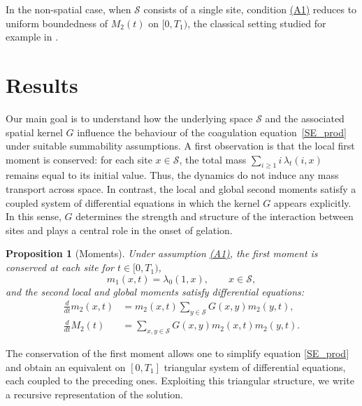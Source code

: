 \documentclass[12pt,twoside]{article}
\newtheorem{prop}[thm]{Proposition}
\begin{document}
In the non-spatial case, when $\mathcal S$ consists of a single site,
condition \hyperlink{ass:A1}{(A1)} reduces to uniform boundedness of $M_2(t)$ on $[0,T_1)$, the
classical setting studied for example in \cite[Theorem~1]{mcleod-62-1}.

\section{Results}\label{sec:results}
Our main goal is to understand how the underlying space $\mathcal S$ and the associated spatial kernel $G$ influence the behaviour of the coagulation equation~\eqref{SE_prod} under suitable summability assumptions.  
A first observation is that the local first moment is conserved: for each site $x\in\mathcal S$, the total mass $\sum_{i\ge1} i\,\lambda_t(i,x)$
remains equal to its initial value. Thus, the dynamics do not induce any mass transport across space.  
In contrast, the local and global second moments satisfy a coupled system of differential equations in which the kernel $G$ appears explicitly. In this sense, $G$ determines the strength and structure of the interaction between sites and plays a central role in the onset of gelation.
\begin{prop}[Moments]\label{prop:moment-equations}
Under assumption \hyperlink{ass:A1}{(A1)},  the first moment is conserved at each site for $t\in[0,T_1)$,
\begin{equation}\label{eq:consm1}
m_1(x,t)=\lambda_0(1,x),
\qquad x\in\mathcal S,
\end{equation}
and the second  local and global moments satisfy differential equations:
\begin{align}
\frac{d}{dt} m_2(x,t)&= m_2(x,t)\sum_{y\in\mathcal S} G(x,y)m_2(y,t), \label{eq:m2-local-prop} \\
\frac{d}{dt} M_2(t)&= \sum_{x,y\in\mathcal S} G(x,y)m_2(x,t)m_2(y,t).\label{eq:M2-global}
\end{align}
\end{prop}
The conservation of the first moment allows one to simplify equation \eqref{SE_prod}
and obtain an equivalent on $[0,T_1]$ triangular system of differential equations, each coupled to the preceding ones.  Exploiting this triangular structure, we write a recursive
representation of the solution.
\end{document}
